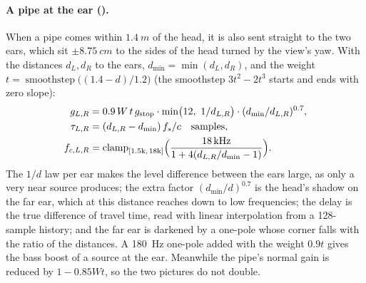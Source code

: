 \paragraph{A pipe at the ear ().} When a pipe comes within $\SI{1.4}{m}$ of the head, it is also sent
straight to the two ears, which sit $\pm\SI{8.75}{cm}$ to the sides of the head turned by the view's yaw. With the
distances $d_L, d_R$ to the ears, $d_\mathrm{min} = \min(d_L,d_R)$, and the weight
$t = \operatorname{smoothstep}\bigl((1.4-d)/1.2\bigr)$ (the smoothstep $3t^2-2t^3$ starts and ends with zero slope):
\begin{align}
  g_{L,R} &= 0.9\,W\,t\,g_\mathrm{stop}\cdot\min\bigl(12,\ 1/d_{L,R}\bigr)\cdot(d_\mathrm{min}/d_{L,R})^{0.7}, \\
  \tau_{L,R} &= (d_{L,R} - d_\mathrm{min})\,f_s/c \quad\text{samples},\\
  f_{c,L,R} &= \operatorname{clamp}_{[1.5\mathrm{k},\,18\mathrm{k}]}\Bigl(\frac{\SI{18}{kHz}}{1 + 4(d_{L,R}/d_\mathrm{min} - 1)}\Bigr).
\end{align}
The $1/d$ law per ear makes the level difference between the ears large, as only a very near source produces; the
extra factor $(d_\mathrm{min}/d)^{0.7}$ is the head's shadow on the far ear, which at this distance reaches down to
low frequencies; the delay is the true difference of travel time, read with linear interpolation from a 128-sample
history; and the far ear is darkened by a one-pole whose corner falls with the ratio of the distances. A
\SI{180}{Hz} one-pole added with the weight $0.9t$ gives the bass boost of a source at the ear. Meanwhile the pipe's
normal gain is reduced by $1-0.85Wt$, so the two pictures do not double.

